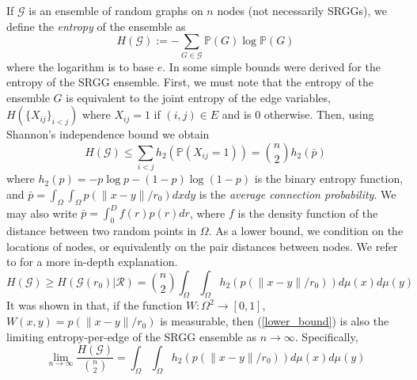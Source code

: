 \documentclass{article}
\newcommand{\tti}{\rightarrow\infty}
\newcommand{\graph}{\mathcal{G}}
\newcommand{\bigO}[1]{\mathcal{O}\left(#1\right)}
\newcommand{\prob}[1]{\mathbb{P}\left(#1\right)}
\begin{document}
If $\graph$ is an ensemble of random graphs on $n$ nodes (not necessarily SRGGs), we define the \textit{entropy} of the ensemble as
\begin{equation}
    H(\graph) := -\sum_{G \in \graph} \prob{G}\log \prob{G}
\end{equation}
where the logarithm is to base $e$. In \cite{coon2018entropy} some simple bounds were derived for the entropy of the SRGG ensemble. First, we must note that the entropy of the ensemble $G$ is equivalent to the joint entropy of the edge variables, $H(\{X_{ij}\}_{i<j})$ where $X_{ij} = 1$ if $(i,j)\in E$ and is 0 otherwise. Then, using Shannon's independence bound we obtain
\begin{equation}
    H(\graph) \leq \sum_{i<j} h_2(\prob{X_{ij} = 1}) = \binom{n}{2}h_2(\bar{p})
\end{equation}
where $h_2(p) = -p\log p - (1-p)\log(1-p)$ is the binary entropy function, and $\bar{p} = \int_{\Omega}\int_{\Omega} p(\|x-y\|/r_0) dxdy$ is the \textit{average connection probability}. We may also write $\bar{p} = \int_0^D f(r)p(r)dr$, where $f$ is the density function of the distance between two random points in $\Omega$. As a lower bound, we condition on the locations of nodes, or equivalently on the pair distances between nodes. We refer to \cite{coon2018entropy} for a more in-depth explanation.
\begin{equation}
    \label{lower_bound}
    H(\graph) \geq H(\graph(r_0)|\mathcal{R})= \binom{n}{2}\int_{\Omega}\int_{\Omega} h_2(p(\|x-y\|/r_0)) d\mu(x)d\mu(y)
\end{equation}
It was shown in \cite[Theorem D.5]{janson2010graphons} that, if the function $W : \Omega^2 \to [0,1]$, $W(x,y) = p(\|x-y\|/r_0)$ is measurable, then (\ref{lower_bound}) is also the limiting entropy-per-edge of the SRGG ensemble as $n\tti$. Specifically,
\begin{equation}
    \lim_{n\rightarrow\infty} \frac{H(\graph)}{\binom{n}{2}} = \int_{\Omega}\int_{\Omega} h_2(p(\|x-y\|/r_0)) d\mu(x)d\mu(y)
\end{equation}
\end{document}
